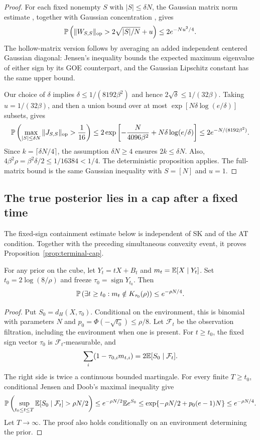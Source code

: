 \documentclass[11pt,reqno]{amsart}
\newcommand{\op}{\operatorname{op}}
\newcommand{\sign}{\operatorname{sign}}
\begin{document}
\begin{proof}
For each fixed nonempty $S$ with $|S|\le\delta N$, the Gaussian
matrix norm estimate \cite[Section~3.3]{bandeira2026mixing}, together with
Gaussian concentration \cite[Section~5.4]{boucheron2013concentration}, gives
\[
 \bbP\left(\|W_{S,S}\|_{\op}>2\sqrt{|S|/N}+u\right)
       \le2e^{-Nu^2/4}.
\]
The hollow-matrix version follows by averaging an added independent
centered Gaussian diagonal: Jensen's inequality bounds the expected
maximum eigenvalue of either sign by its GOE counterpart, and the
Gaussian Lipschitz constant has the same upper bound.

Our choice of $\delta$ implies $\delta\le1/(8192\beta^2)$ and hence
$2\sqrt\delta\le1/(32\beta)$. Taking $u=1/(32\beta)$, and then a union
bound over at most $\exp[N\delta\log(e/\delta)]$ subsets, gives
\[
 \bbP\left(\max_{|S|\le\delta N}\|J_{S,S}\|_{\op}>\frac1{16}\right)
 \le2\exp\left[-\frac N{4096\beta^2}
                +N\delta\log(e/\delta)\right]
 \le2e^{-N/(8192\beta^2)}.
\]
Since $k=\lceil\delta N/4\rceil$, the assumption $\delta N\ge4$ ensures
$2k\le\delta N$. Also,
$4\beta^2\rho=\beta^2\delta/2\le1/16384<1/4$.
The deterministic proposition applies. The full-matrix bound is the same
Gaussian inequality with $S=[N]$ and $u=1$.
\end{proof}

\subsection{The true posterior lies in a cap after a fixed time}

The fixed-sign containment estimate below is independent of SK and of the AT condition. Together with the preceding simultaneous convexity event, it proves Proposition~\ref{prop:terminal-cap}.

\begin{cor}
For any prior on the cube, let $Y_t=tX+B_t$ and $m_t={\mathbb{E}}[X\mid Y_t]$. Set $t_0=2\log(8/\rho)$ and freeze $\tau_0=\sign Y_{t_0}$. Then
\[
 {\mathbb{P}}\left(\exists t\ge t_0:m_t\notin K_{\tau_0}(\rho)\right)
      \le e^{-\rho N/4}.
\]
\end{cor}

\begin{proof}
Put $S_0=d_H(X,\tau_0)$. Conditional on the environment, this is binomial
with parameters $N$ and $p_0=\Phi(-\sqrt{t_0})\le\rho/8$.
Let $\mathcal F_t$ be the observation filtration, including the environment when one is present.
For $t\ge t_0$, the fixed sign vector $\tau_0$ is $\mathcal F_t$-measurable,
and
\[
 \sum_i(1-\tau_{0,i}m_{t,i})
   =2{\mathbb{E}}[S_0\mid\mathcal F_t].
\]
The right side is twice a continuous bounded martingale. For every finite $T\ge t_0$, conditional Jensen and Doob's maximal inequality \cite[Section~1.3.A]{karatzas1991brownian} give
\[
 {\mathbb{P}}\left(\sup_{t_0\le t\le T}{\mathbb{E}}[S_0\mid\mathcal F_t]>\rho N/2\right)
 \le e^{-\rho N/2}{\mathbb{E}} e^{S_0}
 \le\exp\{-\rho N/2+p_0(e-1)N\}
 \le e^{-\rho N/4}.
\]
Let $T\to\infty$. The proof also holds conditionally on an environment determining the prior.
\end{proof}
\end{document}
